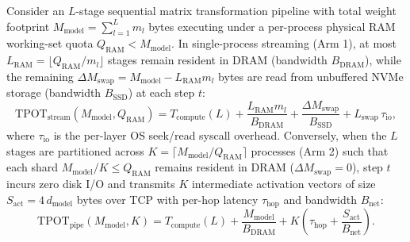 \documentclass[10pt,a4paper]{article}
\begin{document}
Consider an $L$-stage sequential matrix transformation pipeline with total weight footprint $M_{\text{model}} = \sum_{l=1}^L m_l$ bytes executing under a per-process physical RAM working-set quota $Q_{\text{RAM}} < M_{\text{model}}$. In single-process streaming (Arm 1), at most $L_{\text{RAM}} = \lfloor Q_{\text{RAM}} / m_l \rfloor$ stages remain resident in DRAM (bandwidth $B_{\text{DRAM}}$), while the remaining $\Delta M_{\text{swap}} = M_{\text{model}} - L_{\text{RAM}} m_l$ bytes are read from unbuffered NVMe storage (bandwidth $B_{\text{SSD}}$) at each step $t$:
\begin{equation}
\label{eq:tpot_swap}
\text{TPOT}_{\text{stream}}(M_{\text{model}}, Q_{\text{RAM}}) = T_{\text{compute}}(L) + \frac{L_{\text{RAM}} m_l}{B_{\text{DRAM}}} + \frac{\Delta M_{\text{swap}}}{B_{\text{SSD}}} + L_{\text{swap}}\,\tau_{\text{io}},
\end{equation}
where $\tau_{\text{io}}$ is the per-layer OS seek/read syscall overhead. Conversely, when the $L$ stages are partitioned across $K = \lceil M_{\text{model}} / Q_{\text{RAM}} \rceil$ processes (Arm 2) such that each shard $M_{\text{model}}/K \le Q_{\text{RAM}}$ remains resident in DRAM ($\Delta M_{\text{swap}} = 0$), step $t$ incurs zero disk I/O and transmits $K$ intermediate activation vectors of size $S_{\text{act}} = 4\,d_{\text{model}}$ bytes over TCP with per-hop latency $\tau_{\text{hop}}$ and bandwidth $B_{\text{net}}$:
\begin{equation}
\label{eq:tpot_ring}
\text{TPOT}_{\text{pipe}}(M_{\text{model}}, K) = T_{\text{compute}}(L) + \frac{M_{\text{model}}}{B_{\text{DRAM}}} + K \left(\tau_{\text{hop}} + \frac{S_{\text{act}}}{B_{\text{net}}}\right).
\end{equation}
\end{document}
